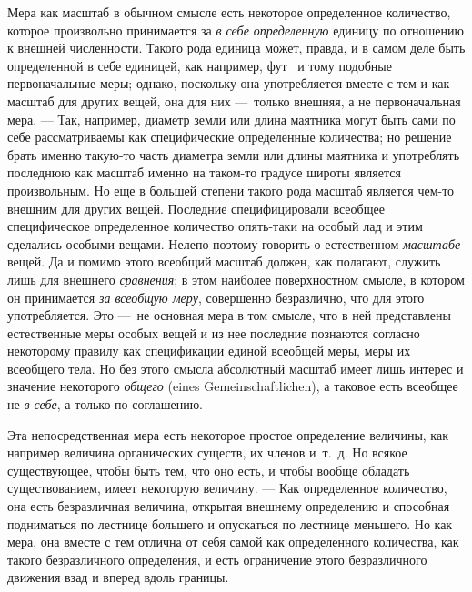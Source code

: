 Мера как масштаб в обычном смысле есть некоторое определенное количество,
которое произвольно принимается за {\em в себе
определенную} единицу по отношению к внешней численности. Такого рода
единица может, правда, и в самом деле быть определенной в себе единицей,
как например,
{фут}~
и тому подобные первоначальные меры; однако, поскольку она употребляется
вместе с тем и как масштаб для других вещей, она для них —~только внешняя,
а не первоначальная мера. — Так, например, диаметр земли или длина маятника
могут быть сами по себе рассматриваемы как специфические определенные
количества; но решение брать именно такую-то часть диаметра земли или длины
маятника и употреблять последнюю как масштаб именно на таком-то градусе
широты является произвольным. Но еще в большей степени такого рода масштаб
является чем-то внешним для других вещей. Последние специфицировали
всеобщее специфическое определенное количество опять-таки на особый лад и
этим сделались особыми вещами. Нелепо поэтому говорить о естественном
{\em масштабе} вещей. Да и помимо этого всеобщий
масштаб должен, как полагают, служить лишь для внешнего
{\em сравнения}; в этом наиболее поверхностном смысле,
в котором он принимается {\em за всеобщую меру},
совершенно безразлично, что для этого употребляется. Это —~не основная мера
в том смысле, что в ней представлены естественные меры особых вещей и из
нее последние познаются согласно некоторому правилу как спецификации единой
всеобщей меры, меры их всеобщего тела. Но без этого смысла абсолютный
масштаб имеет лишь интерес и значение некоторого
{\em общего} (eines Gemeinschaftlichen), а таковое есть
всеобщее не {\em в себе}, а только по соглашению.

Эта непосредственная мера есть некоторое простое определение величины, как
например величина органических существ, их членов и~т.~д. Но всякое
существующее, чтобы быть тем, что оно есть, и чтобы вообще обладать
существованием, имеет некоторую величину. — Как определенное количество,
она есть безразличная величина, открытая внешнему определению и способная
подниматься по лестнице большего и опускаться по лестнице меньшего. Но как
мера, она вместе с тем отлична от себя самой как определенного количества,
как такого безразличного определения, и есть ограничение этого
безразличного движения взад и вперед вдоль границы.

